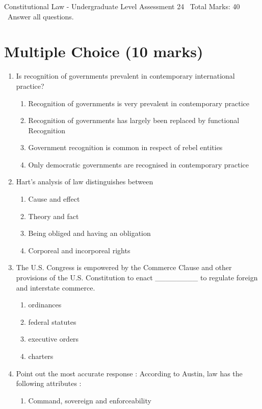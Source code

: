 \documentclass[12pt]{article}
\begin{document}
\begin{center}
Constitutional Law - Undergraduate Level Assessment 24 \
Total Marks: 40 \
Answer all questions.
\end{center}

\section*{Multiple Choice (10 marks)}
\begin{enumerate}[label=\arabic*.]
\item Is recognition of governments prevalent in contemporary international practice?
\begin{enumerate}[label=(\alph*)]
    \item Recognition of governments is very prevalent in contemporary practice
    \item Recognition of governments has largely been replaced by functional Recognition
    \item Government recognition is common in respect of rebel entities
    \item Only democratic governments are recognised in contemporary practice
\end{enumerate}
\item Hart's analysis of law distinguishes between
\begin{enumerate}[label=(\alph*)]
    \item Cause and effect
    \item Theory and fact
    \item Being obliged and having an obligation
    \item Corporeal and incorporeal rights
\end{enumerate}
\item The U.S. Congress is empowered by the Commerce Clause and other provisions of the U.S. Constitution to enact \_\_\_\_\_\_\_\_ to regulate foreign and interstate commerce.
\begin{enumerate}[label=(\alph*)]
    \item ordinances
    \item federal statutes
    \item executive orders
    \item charters
\end{enumerate}
\item Point out the most accurate response : According to Austin, law has the following attributes :
\begin{enumerate}[label=(\alph*)]
    \item Command, sovereign and enforceability

\end{enumerate}
\end{enumerate}
\end{document}
